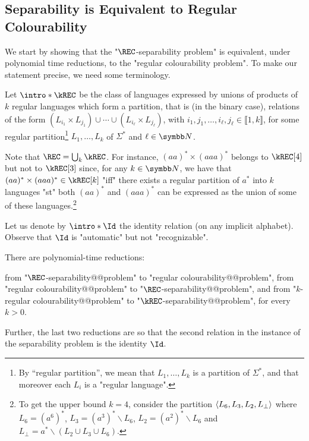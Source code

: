 \subsection{Separability is Equivalent to Regular Colourability}

We start by showing that the "$\REC$-separability problem" is equivalent,
under polynomial time reductions, to the "regular colourability problem". To make our statement precise, we need some terminology.

\AP Let $\intro*\kREC$ be the class of languages expressed by unions of products of $k$ regular languages which form a partition, that is (in the binary case), relations of the form $(L_{i_1} \times L_{j_1}) \cup \dotsb \cup (L_{i_\ell} \times L_{j_\ell})$, with $i_1,j_1,\hdots,i_\ell, j_\ell \in \lBrack 1,k \rBrack$, for some regular partition\footnote{By ``regular partition'',
we mean that $L_1, \dotsc, L_{k}$ is a partition of $\Sigma^*$, and that moreover
each $L_i$ is a "regular language".} $L_1, \dotsc, L_{k}$ of $\Sigma^*$ and $\ell \in \N$.

Note that $\REC = \bigcup_k \kREC$.
For instance, $(aa)^* \times (aaa)^*$ belongs to $\kREC[4]$ but not to $\kREC[3]$
since, for any $k\in \N$, we have that $(aa)^* \times (aaa)^* \in \kREC[k]$ "iff"
there exists a regular partition of $a^*$ into $k$ languages "st" both
$(aa)^*$ and $(aaa)^*$ can be expressed as the union of some of these languages.\footnote{To get the
upper bound $k=4$, consider the partition $\langle L_6, L_3, L_2, L_\bot\rangle$ where $L_6 = (a^6)^*$,
$L_3 = (a^3)^* \smallsetminus L_6$, $L_2 = (a^2)^* \smallsetminus L_6$ and $L_\bot = a^* \smallsetminus (L_2 \cup L_3 \cup L_6)$.}

\AP Let us denote by $\intro*\Id$ the identity relation (on any implicit alphabet). Observe that $\Id$ is "automatic" but not "recognizable".

\begin{theorem}
    \AP\label{thm:reg-colourability-equiv-separability}
    There are polynomial-time reductions: 
    \begin{enumerate}
        \itemAP\label{item:reg-colourability-equiv-separability-1} from "$\REC$-separability@@problem" to "regular colourability@@problem", 
        \itemAP\label{item:reg-colourability-equiv-separability-2} from "regular colourability@@problem" to "$\REC$-separability@@problem", and
        \itemAP\label{item:reg-colourability-equiv-separability-3} from "$k$-regular colourability@@problem" to "$\kREC$-separability@@problem", for every $k > 0$.
    \end{enumerate}
    Further, the last two reductions are so that the second relation in the instance of the separability problem is the identity $\Id$.
\end{theorem}
   
